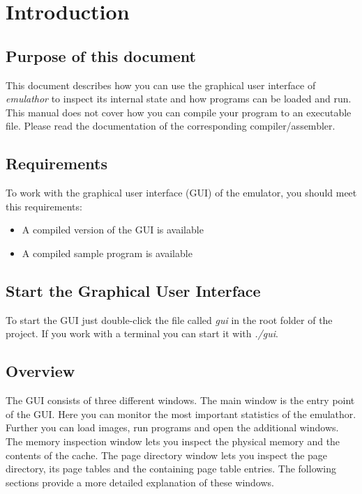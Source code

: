 \section{Introduction}
\subsection{Purpose of this document}
This document describes how you can use the graphical user interface of \emph{emulathor} to inspect its internal state and how programs can be loaded and run. This manual does not cover how you can compile your program to an executable file. Please read the documentation of the corresponding compiler/assembler.

\subsection{Requirements}
To work with the graphical user interface (GUI) of the emulator, you should meet this requirements:

\begin{itemize}
\item A compiled version of the GUI is available 
\item A compiled sample program is available
\end{itemize}

\subsection{Start the Graphical User Interface}
To start the GUI just double-click the file called \emph{gui} in the root folder of the project. If you work with a terminal you can start it with \emph{./gui}.

\subsection{Overview}
The GUI consists of three different windows. The main window is the entry point of the GUI. Here you can monitor the most important statistics of the emulathor. Further you can load images, run programs and open the additional windows.
The memory inspection window lets you inspect the physical memory and the contents of the cache. The page directory window lets you inspect the page directory, its page tables and the containing page table entries.
The following sections provide a more detailed explanation of these windows.
